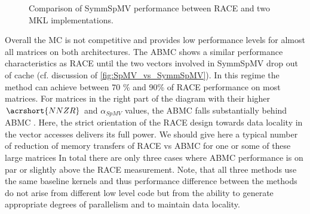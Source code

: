 \begin{figure}[thbp]
	\centering
	\hspace{1em}
	\caption{Comparison of \acrshort{SymmSpMV} performance between \acrshort{RACE} and two \acrshort{MKL} implementations.}
	\label{fig:symm_spmv_mkl}
\end{figure}

Overall the \acrshort{MC} is not competitive and provides low performance levels for almost all matrices on both architectures. The \acrshort{ABMC} shows a similar performance characteristics as \acrshort{RACE} until the two vectors involved in \acrshort{SymmSpMV} drop out of cache (cf. discussion of \cref{fig:SpMV_vs_SymmSpMV}). In this regime the method can achieve between 70 \% and 90\% of \acrshort{RACE} performance on most matrices. For matrices in the right part of the diagram with their higher $\acrshort{NNZR}$ and $\alpha_{SpMV}$ values, the \acrshort{ABMC} falls substantially behind \acrshort{ABMC} . Here, the strict orientation of the \acrshort{RACE} design towards data locality in the vector accesses delivers its full power.
{\GW We should give here a typical number of reduction of memory transfers of RACE vs ABMC for one or some of these large matrices}
In total there are only three cases where \acrshort{ABMC} performance is on par or slightly above the \acrshort{RACE} measurement.
Note, that all three methods use the same baseline kernels and thus performance difference between the methods do not arise from different low level code but from the ability to generate appropriate degrees of parallelism and to maintain data locality.

